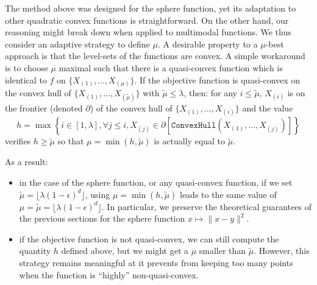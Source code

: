 The method above was designed for the sphere function, yet its adaptation to other quadratic convex functions is straightforward. On the other hand, our reasoning might break down when applied to 
multimodal functions.
We thus consider an adaptive strategy to define $\mu$.  A desirable property to a $\mu$-best approach is that the level-sets of the functions are convex.  {A simple workaround is to choose $\mu$ maximal such that there is a quasi-convex function which is identical to $f$ on $\{X_{(1)},\dots,X_{(\mu)}\}$.}
If the objective function is quasi-convex on the convex hull of $\{X_{(1)},\dots,X_{(\tilde{\mu})}\}$ with $\tilde{\mu} \le \lambda$, then: for any $i \le \tilde{\mu}$,
$X_{(i)}$ is on the frontier (denoted $\partial$) of the convex hull of $\{X_{(1)},\dots,X_{(i)}\}$ and the value $$h=\max \left\{ i\in [1,\lambda], \forall j\leq i, X_{(j)}\in \partial\left[\texttt{ConvexHull}(X_{(1)},\dots,X_{(j)})\right]\right\}$$ verifies $h \geq \tilde \mu$ so that $\mu=\min(h,\tilde\mu)$ is actually equal to $\tilde \mu$.
{As a result:
\begin{itemize}
    \item in the case of the sphere function, or any quasi-convex function, if we set $\tilde \mu=\lfloor \lambda (1-\epsilon)^d\rfloor$, using $\mu=\min(h,\tilde \mu)$ leads to the same value of $\mu=\tilde \mu = \lfloor \lambda (1-\epsilon)^d\rfloor$. In particular, we preserve the theoretical guarantees of the previous sections for the sphere function $x\mapsto \lVert x-y\rVert ^2$.
    \item if the objective function is not quasi-convex, we can still compute the quantity $h$ defined above, but we might get a $\mu$ smaller than $\tilde \mu$. However, this strategy remains meaningful at it prevents from keeping too many points when the function is  ``highly'' non-quasi-convex.
\end{itemize}
}
